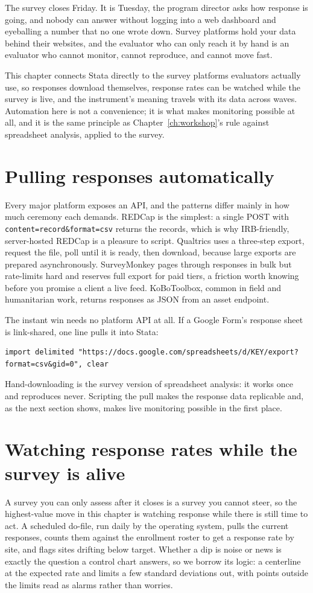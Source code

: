 \documentclass[
    a4paper,
    fontsize=10pt,
    twoside=true,
    numbers=noenddot,
]{kaobook}
\begin{document}
The survey closes Friday. It is Tuesday, the program director asks how response is going, and nobody can answer without logging into a web dashboard and eyeballing a number that no one wrote down. Survey platforms hold your data behind their websites, and the evaluator who can only reach it by hand is an evaluator who cannot monitor, cannot reproduce, and cannot move fast.

This chapter connects Stata directly to the survey platforms evaluators actually use, so responses download themselves, response rates can be watched while the survey is live, and the instrument's meaning travels with its data across waves. Automation here is not a convenience; it is what makes monitoring possible at all, and it is the same principle as Chapter~\ref{ch:workshop}'s rule against spreadsheet analysis, applied to the survey.

\section{Pulling responses automatically}
Every major platform exposes an API, and the patterns differ mainly in how much ceremony each demands. REDCap is the simplest: a single POST with \texttt{content=record\&format=csv} returns the records, which is why IRB-friendly, server-hosted REDCap is a pleasure to script. Qualtrics uses a three-step export, request the file, poll until it is ready, then download, because large exports are prepared asynchronously. SurveyMonkey pages through responses in bulk but rate-limits hard and reserves full export for paid tiers, a friction worth knowing before you promise a client a live feed. KoBoToolbox, common in field and humanitarian work, returns responses as JSON from an asset endpoint.

The instant win needs no platform API at all. If a Google Form's response sheet is link-shared, one line pulls it into Stata:
{\footnotesize
\begin{verbatim}
import delimited "https://docs.google.com/spreadsheets/d/KEY/export?format=csv&gid=0", clear
\end{verbatim}
}
Hand-downloading is the survey version of spreadsheet analysis: it works once and reproduces never. Scripting the pull makes the response data replicable and, as the next section shows, makes live monitoring possible in the first place.

\section{Watching response rates while the survey is alive}\label{sec:monitor}
A survey you can only assess after it closes is a survey you cannot steer, so the highest-value move in this chapter is watching response while there is still time to act. A scheduled do-file, run daily by the operating system, pulls the current responses, counts them against the enrollment roster to get a response rate by site, and flags sites drifting below target. Whether a dip is noise or news is exactly the question a control chart answers, so we borrow its logic: a centerline at the expected rate and limits a few standard deviations out, with points outside the limits read as alarms rather than worries.
\end{document}
